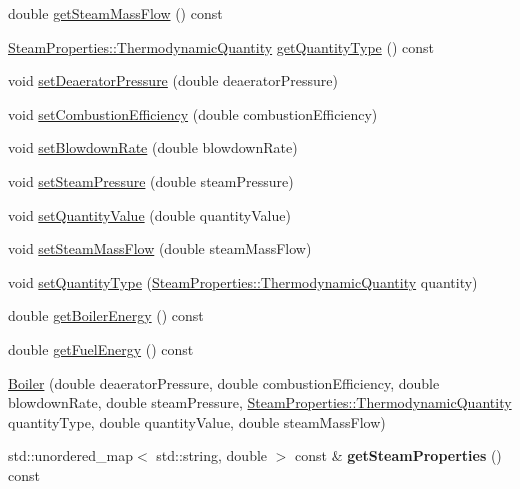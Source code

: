 \begin{DoxyCompactItemize}
\item 
double \hyperlink{class_boiler_a4101e71234995558a451dcab145b5fc9}{get\+Steam\+Mass\+Flow} () const
\item 
\hyperlink{class_steam_properties_ae0294bedf7d178c2d8fb6aed0f62fbff}{Steam\+Properties\+::\+Thermodynamic\+Quantity} \hyperlink{class_boiler_a26a71f789c9f9e05bd43a1ca0219f920}{get\+Quantity\+Type} () const
\item 
void \hyperlink{class_boiler_a56f422254606ebba1248ae0b4f8f0215}{set\+Deaerator\+Pressure} (double deaerator\+Pressure)
\item 
void \hyperlink{class_boiler_abef6bc48101f98f0650cb07fb1d51f74}{set\+Combustion\+Efficiency} (double combustion\+Efficiency)
\item 
void \hyperlink{class_boiler_a66c0e4c577dbd3f52dcf202e69a08371}{set\+Blowdown\+Rate} (double blowdown\+Rate)
\item 
void \hyperlink{class_boiler_a0a4619ff73c9969daebe3aa66ddad6be}{set\+Steam\+Pressure} (double steam\+Pressure)
\item 
void \hyperlink{class_boiler_ac3450d88dba124529d59baf62c39e14a}{set\+Quantity\+Value} (double quantity\+Value)
\item 
void \hyperlink{class_boiler_ada7af5896a2a4701d78a532dc9bc9892}{set\+Steam\+Mass\+Flow} (double steam\+Mass\+Flow)
\item 
void \hyperlink{class_boiler_a9c5b20cae6133c9174b12760f36d52c2}{set\+Quantity\+Type} (\hyperlink{class_steam_properties_ae0294bedf7d178c2d8fb6aed0f62fbff}{Steam\+Properties\+::\+Thermodynamic\+Quantity} quantity)
\item 
double \hyperlink{class_boiler_a8cc9ad5f1b36f5dcbcb225e9e3d13a39}{get\+Boiler\+Energy} () const
\item 
double \hyperlink{class_boiler_a55542a761669c842163b20932f9747d3}{get\+Fuel\+Energy} () const
\item 
\hyperlink{class_boiler_adebe1dca06edc8dbca462e226b4dd9d5}{Boiler} (double deaerator\+Pressure, double combustion\+Efficiency, double blowdown\+Rate, double steam\+Pressure, \hyperlink{class_steam_properties_ae0294bedf7d178c2d8fb6aed0f62fbff}{Steam\+Properties\+::\+Thermodynamic\+Quantity} quantity\+Type, double quantity\+Value, double steam\+Mass\+Flow)
\item 
\mbox{\label{class_boiler_a432ff9b941a9fd3a36dc2c58bbb1fc60}} 
std\+::unordered\+\_\+map$<$ std\+::string, double $>$ const  \& {\bfseries get\+Steam\+Properties} () const
\item 

\end{DoxyCompactItemize}

